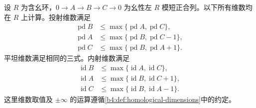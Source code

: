 \begin{proposition}\label{b4:prop:dimension-short-exact}
	设 \(R\) 为含幺环，\(0\to A\to B\to C\to0\) 为幺性左 \(R\) 模短正合列。以下所有维数均在 \(R\) 上计算。投射维数满足
	\[
		\begin{aligned}
			\operatorname{pd}B&\le\max\{\operatorname{pd}A,\operatorname{pd}C\},\\
			\operatorname{pd}A&\le\max\{\operatorname{pd}B,\operatorname{pd}C-1\},\\
			\operatorname{pd}C&\le\max\{\operatorname{pd}B,\operatorname{pd}A+1\}.
		\end{aligned}
	\]
	平坦维数满足相同的三式。内射维数满足
	\[
		\begin{aligned}
			\operatorname{id}B&\le\max\{\operatorname{id}A,\operatorname{id}C\},\\
			\operatorname{id}A&\le\max\{\operatorname{id}B,\operatorname{id}C+1\},\\
			\operatorname{id}C&\le\max\{\operatorname{id}B,\operatorname{id}A-1\}.
		\end{aligned}
	\]
	这里维数取值及 \(\pm\infty\) 的运算遵循\cref{b4:def:homological-dimensions}中的约定。
\end{proposition}
